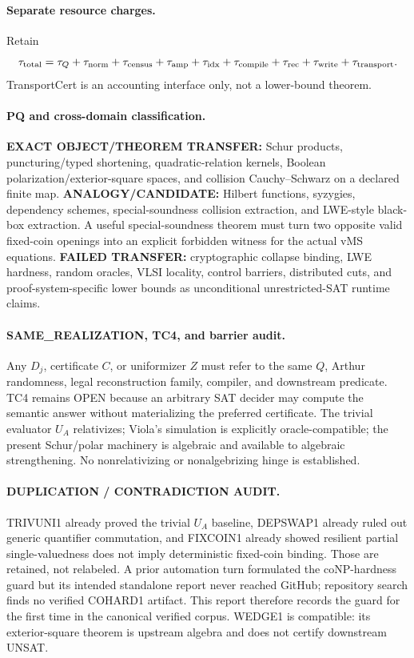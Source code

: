 \documentclass[11pt]{article}
\begin{document}
\paragraph{Separate resource charges.}
Retain
\[
\tau_{\rm total}=\tau_Q+\tau_{\rm norm}+\tau_{\rm census}+\tau_{\rm amp}+\tau_{\rm idx}+\tau_{\rm compile}+\tau_{\rm rec}+\tau_{\rm write}+\tau_{\rm transport}.
\]
TransportCert is an accounting interface only, not a lower-bound theorem.

\paragraph{PQ and cross-domain classification.}
\textbf{EXACT OBJECT/THEOREM TRANSFER:} Schur products, puncturing/typed shortening, quadratic-relation kernels, Boolean polarization/exterior-square spaces, and collision Cauchy--Schwarz on a declared finite map. \textbf{ANALOGY/CANDIDATE:} Hilbert functions, syzygies, dependency schemes, special-soundness collision extraction, and LWE-style black-box extraction. A useful special-soundness theorem must turn two opposite valid fixed-coin openings into an explicit forbidden witness for the actual vMS equations. \textbf{FAILED TRANSFER:} cryptographic collapse binding, LWE hardness, random oracles, VLSI locality, control barriers, distributed cuts, and proof-system-specific lower bounds as unconditional unrestricted-SAT runtime claims.

\paragraph{SAME\_REALIZATION, TC4, and barrier audit.}
Any $D_j$, certificate $C$, or uniformizer $Z$ must refer to the same $Q$, Arthur randomness, legal reconstruction family, compiler, and downstream predicate. TC4 remains OPEN because an arbitrary SAT decider may compute the semantic answer without materializing the preferred certificate. The trivial evaluator $U_A$ relativizes; Viola's simulation is explicitly oracle-compatible; the present Schur/polar machinery is algebraic and available to algebraic strengthening. No nonrelativizing or nonalgebrizing hinge is established.

\paragraph{DUPLICATION / CONTRADICTION AUDIT.}
TRIVUNI1 already proved the trivial $U_A$ baseline, DEPSWAP1 already ruled out generic quantifier commutation, and FIXCOIN1 already showed resilient partial single-valuedness does not imply deterministic fixed-coin binding. Those are retained, not relabeled. A prior automation turn formulated the coNP-hardness guard but its intended standalone report never reached GitHub; repository search finds no verified COHARD1 artifact. This report therefore records the guard for the first time in the canonical verified corpus. WEDGE1 is compatible: its exterior-square theorem is upstream algebra and does not certify downstream UNSAT.
\end{document}
